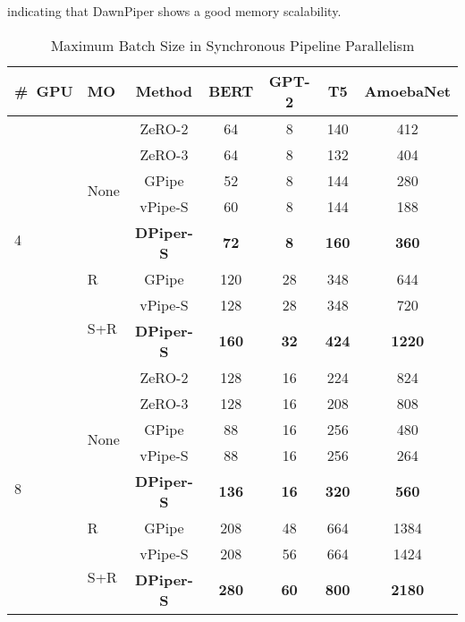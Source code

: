 indicating that DawnPiper shows a good memory scalability.

\begin{table}[htbp]
  \centering
  \caption{Maximum Batch Size in Synchronous Pipeline Parallelism}
    \begin{tabular}{m{2em}|m{2em}|ccccc}
    \toprule
    \#\ GPU & MO & Method & BERT & GPT-2 & T5 & AmoebaNet \\
    \midrule
    \multirow{8}{*}{4} & \multirow{5}{*}{None} & ZeRO-2 & 64    & 8     & 140   & 412 \\
          &       & ZeRO-3 & 64    & 8     & 132   & 404 \\
          &       & GPipe & 52    & 8     & 144   & 280 \\
          &       & vPipe-S & 60    & 8     & 144   & 188 \\
          &       & \textbf{DPiper-S} & \textbf{72} & \textbf{8} & \textbf{160} & \textbf{360} \\
\cmidrule{2-7}          & R & GPipe & 120   & 28    & 348   & 644 \\
\cmidrule{2-2}          & \multirow{2}{*}{S+R} & vPipe-S & 128   & 28    & 348   & 720 \\
          &       & \textbf{DPiper-S} & \textbf{160} & \textbf{32} & \textbf{424} & \textbf{1220} \\
    \midrule
    \multirow{8}{*}{8} & \multirow{5}{*}{None} & ZeRO-2 & 128   & 16    & 224   & 824 \\
          &       & ZeRO-3 & 128   & 16    & 208   & 808 \\
          &       & GPipe & 88    & 16    & 256   & 480 \\
          &       & vPipe-S & 88    & 16    & 256   & 264 \\
          &       & \textbf{DPiper-S} & \textbf{136} & \textbf{16} & \textbf{320} & \textbf{560} \\
\cmidrule{2-7}          & R & GPipe & 208   & 48    & 664   & 1384 \\
\cmidrule{2-2}          & \multirow{2}{*}{S+R} & vPipe-S & 208   & 56    & 664   & 1424 \\
          &       & \textbf{DPiper-S} & \textbf{280} & \textbf{60} & \textbf{800} & \textbf{2180} \\
    \bottomrule
    \end{tabular}%
  \label{table:maxbs-sync}%
\end{table}

